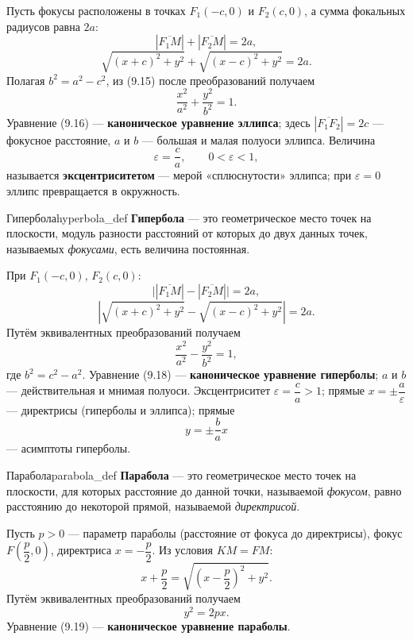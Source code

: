\documentclass[12pt,a4paper]{article}
\begin{document}
Пусть фокусы расположены в точках $F_1(-c, 0)$ и $F_2(c, 0)$, а сумма
фокальных радиусов равна $2a$:
\[
  |\overline{F_1 M}| + |\overline{F_2 M}| = 2a,
\]
\begin{equation}
  \sqrt{(x + c)^2 + y^2} + \sqrt{(x - c)^2 + y^2} = 2a. \tag{9.15}
\end{equation}
Полагая $b^2 = a^2 - c^2$, из (9.15) после преобразований получаем
\begin{equation}
  \frac{x^2}{a^2} + \frac{y^2}{b^2} = 1. \tag{9.16}
\end{equation}
Уравнение (9.16) — \textbf{каноническое уравнение эллипса}; здесь
$|\overline{F_1 F_2}| = 2c$ — фокусное расстояние, $a$ и $b$ — большая и
малая полуоси эллипса. Величина
\[
  \varepsilon = \frac{c}{a}, \qquad 0 < \varepsilon < 1,
\]
называется \textbf{эксцентриситетом} — мерой «сплюснутости» эллипса; при
$\varepsilon = 0$ эллипс превращается в окружность.

\begin{definition}{Гипербола}{hyperbola_def}
  \textbf{Гипербола} — это геометрическое место точек на плоскости, модуль
  разности расстояний от которых до двух данных точек, называемых
  \emph{фокусами}, есть величина постоянная.
\end{definition}

При $F_1(-c, 0)$, $F_2(c, 0)$:
\[
  \bigl| |\overline{F_1 M}| - |\overline{F_2 M}| \bigr| = 2a,
\]
\begin{equation}
  \left| \sqrt{(x + c)^2 + y^2} - \sqrt{(x - c)^2 + y^2} \right| = 2a.
  \tag{9.17}
\end{equation}
Путём эквивалентных преобразований получаем
\begin{equation}
  \frac{x^2}{a^2} - \frac{y^2}{b^2} = 1, \tag{9.18}
\end{equation}
где $b^2 = c^2 - a^2$. Уравнение (9.18) — \textbf{каноническое уравнение
гиперболы}; $a$ и $b$ — действительная и мнимая полуоси. Эксцентриситет
$\varepsilon = \dfrac{c}{a} > 1$; прямые $x = \pm\dfrac{a}{\varepsilon}$ —
директрисы (гиперболы и эллипса); прямые
\[
  y = \pm\frac{b}{a}x
\]
— асимптоты гиперболы.

\begin{definition}{Парабола}{parabola_def}
  \textbf{Парабола} — это геометрическое место точек на плоскости, для
  которых расстояние до данной точки, называемой \emph{фокусом}, равно
  расстоянию до некоторой прямой, называемой \emph{директрисой}.
\end{definition}

Пусть $p > 0$ — параметр параболы (расстояние от фокуса до директрисы),
фокус $F\left(\dfrac{p}{2}, 0\right)$, директриса $x = -\dfrac{p}{2}$. Из
условия $KM = FM$:
\[
  x + \frac{p}{2} = \sqrt{\left(x - \frac{p}{2}\right)^2 + y^2}.
\]
Путём эквивалентных преобразований получаем
\begin{equation}
  y^2 = 2px. \tag{9.19}
\end{equation}
Уравнение (9.19) — \textbf{каноническое уравнение параболы}.
\end{document}
